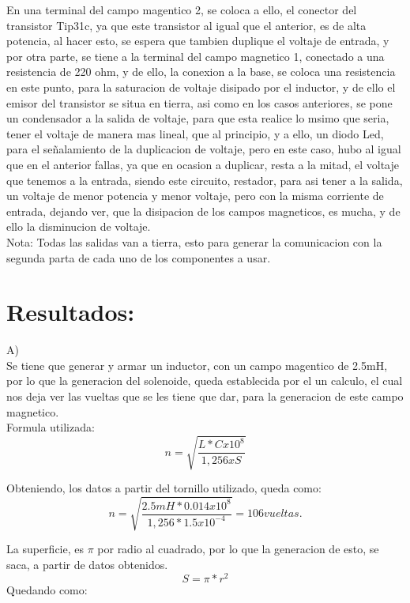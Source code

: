\documentclass[12pt,a4paper]{article}
\begin{document}
En una terminal del campo magentico 2, se coloca a ello, el conector del transistor Tip31c, ya que este transistor al igual que el anterior, es de alta potencia, al hacer esto, se espera que tambien duplique el voltaje de entrada, y por otra parte, se tiene a la terminal del campo magnetico 1, conectado a una resistencia de 220 ohm, y de ello, la conexion a la base, se coloca una resistencia en este punto, para la saturacion de voltaje disipado por el inductor, y de ello el emisor del transistor se situa en tierra, asi como en los casos anteriores, se pone un condensador a la salida de voltaje, para que esta realice lo msimo que seria, tener el voltaje de manera mas lineal, que al principio, y a ello, un diodo Led, para el señalamiento de la duplicacion de voltaje, pero en este caso, hubo al igual que en el anterior fallas, ya que en ocasion a duplicar, resta a la mitad, el voltaje que tenemos a la entrada, siendo este circuito, restador, para asi tener a la salida, un voltaje de menor potencia y menor voltaje, pero con la misma corriente de entrada, dejando ver, que la disipacion de los campos magneticos, es mucha, y de ello la disminucion de voltaje.\\

Nota: Todas las salidas van a tierra, esto para generar la comunicacion con la segunda parta de cada uno de los componentes a usar.

\section{Resultados:}

A)\\

Se tiene que generar y armar un inductor, con un campo magentico de 2.5mH, por lo que la generacion del solenoide, queda establecida por el un calculo, el cual nos deja ver las vueltas que se les tiene que dar, para la generacion de este campo magnetico. \\

Formula utilizada:\\
$$ n=\sqrt{\frac{L*Cx10^{8}}{1,256 x S}} $$

Obteniendo, los datos a partir del tornillo utilizado, queda como:\\
$$ n=\sqrt{\frac{2.5mH*0.014x10^{8}}{1,256 * 1.5x10^{-4}}}= 106 vueltas. $$

La superficie, es $ \pi $ por radio al cuadrado, por lo que la generacion de esto, se saca, a partir de datos obtenidos.\\
$$ S=\pi * r^{2} $$
\newpage
Quedando como:\\
\end{document}

